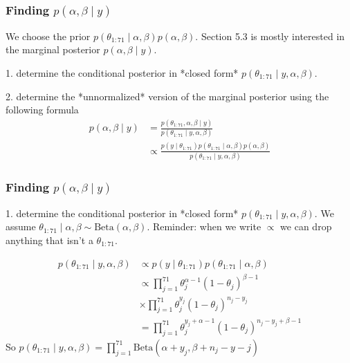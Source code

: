 \documentclass{beamer}
\begin{document}
\begin{frame}
\frametitle{Finding $p(\alpha,\beta \mid y)$ }

We choose the prior $p(\theta_{1:71} \mid \alpha, \beta)p(\alpha, \beta)$. Section 5.3 is mostly interested in the marginal posterior $p(\alpha, \beta \mid y)$. 
\newline

1. determine the conditional posterior in *closed form* $p(\theta_{1:71} \mid y, \alpha, \beta)$. 
\newline
\pause

2. determine the *unnormalized* version of the marginal posterior using the following formula
\begin{align*}
p(\alpha, \beta \mid y) &= \frac{p(\theta_{1:71}, \alpha, \beta  \mid y) }{p(\theta_{1:71} \mid y, \alpha, \beta) } \\
&\propto \frac{p(y \mid \theta_{1:71})p(\theta_{1:71} \mid \alpha, \beta)p(\alpha, \beta) }{p(\theta_{1:71} \mid y, \alpha, \beta) }
\end{align*}
\end{frame}


\begin{frame}
\frametitle{Finding $p(\alpha,\beta \mid y)$ }

1. determine the conditional posterior in *closed form* $p(\theta_{1:71} \mid y, \alpha, \beta)$. We assume $\theta_{1:71} \mid \alpha, \beta \sim \text{Beta}(\alpha,\beta)$. Reminder: when we write $\propto$ we can drop anything that isn't a $\theta_{1:71}$.

\begin{align*}
p(\theta_{1:71} \mid y, \alpha, \beta) &\propto p(y \mid \theta_{1:71})p(\theta_{1:71} \mid \alpha, \beta)\\
&\propto \prod_{j=1}^{71} \theta_j^{\alpha-1}(1-\theta_j)^{\beta-1} \\
&\times \prod_{j=1}^{71}\theta_j^{y_j}(1-\theta_j)^{n_j - y_j} \\
&= \prod_{j=1}^{71}\theta_j^{y_j+\alpha-1}(1-\theta_j)^{n_j - y_j + \beta-1}
\end{align*}
So $p(\theta_{1:71} \mid y, \alpha, \beta) = \prod_{j=1}^{71}\text{Beta}(\alpha + y_j, \beta + n_j - y-j)$


\end{frame}
\end{document}
